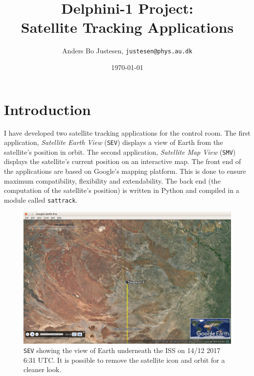\documentclass[10pt,a4paper]{article}
\author{Anders Bo Justesen, \texttt{justesen@phys.au.dk}}
\title{\vspace{-3cm} Delphini-1 Project:\\Satellite Tracking Applications}
\date{\today}
\begin{document}
\maketitle

\section{Introduction}
I have developed two satellite tracking applications for the control room. The first application, \textit{Satellite Earth View} (\texttt{SEV}) displays a view of Earth from the satellite's position in orbit. The second application, \textit{Satellite Map View} (\texttt{SMV}) displays the satellite's current position on an interactive map. The front end of the applications are based on Google's mapping platform. This is done to ensure maximum compatibility, flexibility and extendability. The back end (the computation of the satellite's position) is written in Python and compiled in a module called \texttt{sattrack}.

\begin{figure}
\includegraphics[width=\textwidth]{../Playing.png}
\caption{\texttt{SEV} showing the view of Earth underneath the ISS on 14/12 2017 6:31 UTC. It is possible to remove the satellite icon and orbit for a cleaner look.}
\label{Fig:SEV}
\end{figure}
\end{document}
